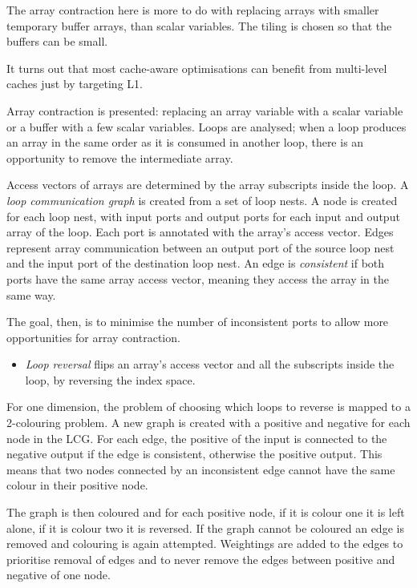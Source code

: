 The array contraction here is more to do with replacing arrays with smaller temporary buffer arrays, than scalar variables.
The tiling is chosen so that the buffers can be small.

It turns out that most cache-aware optimisations can benefit from multi-level caches just by targeting L1.

Array contraction is presented: replacing an array variable with a scalar variable or a buffer with a few scalar variables.
Loops are analysed; when a loop produces an array in the same order as it is consumed in another loop, there is an opportunity to
remove the intermediate array.

Access vectors of arrays are determined by the array subscripts inside the loop.
A \emph{loop communication graph} is created from a set of loop nests. A node is created for each loop nest, with input ports and output ports for each input and output array of the loop. Each port is annotated with the array's access vector.
Edges represent array communication between an output port of the source loop nest and the input port of the destination loop nest.
An edge is \emph{consistent} if both ports have the same array access vector, meaning they access the array in the same way.

The goal, then, is to minimise the number of inconsistent ports to allow more opportunities for array contraction.
\begin{itemize}
\item
\emph{Loop reversal} flips an array's access vector and all the subscripts inside the loop, by reversing the index space.
\end{itemize}
For one dimension, the problem of choosing which loops to reverse is mapped to a 2-colouring problem.
A new graph is created with a positive and negative for each node in the LCG. For each edge, the positive of the input is connected to the negative output if the edge is consistent, otherwise the positive output.
This means that two nodes connected by an inconsistent edge cannot have the same colour in their positive node.

The graph is then coloured and for each positive node, if it is colour one it is left alone, if it is colour two it is reversed.
If the graph cannot be coloured an edge is removed and colouring is again attempted.
Weightings are added to the edges to prioritise removal of edges and to never remove the edges between positive and negative of one node.

